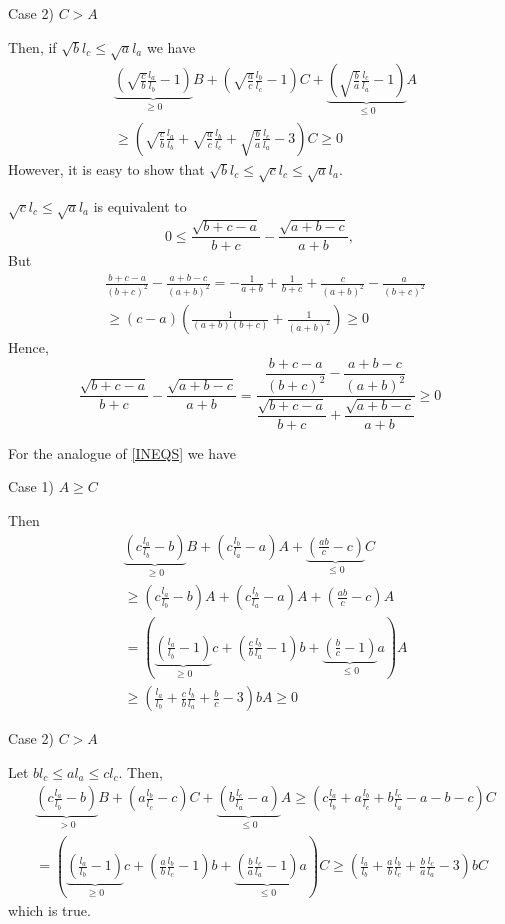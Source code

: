 \documentclass[a4paper,12pt]{article}
\begin{document}
Case 2) $C > A$

Then, if $\sqrt{b}l_c \leq \sqrt{a}{l_a}$ we have
\begin{align*}
&\underbrace{\left(\sqrt{\frac{c}{b}}\frac{l_a}{l_b}-1\right)}_{\geq 0} B+\left(\sqrt{\frac{a}{c}}\frac{l_b}{l_c}-1\right)C+\underbrace{\left(\sqrt{\frac{b}{a}}\frac{l_c}{l_a}-1\right)}_{\leq 0} A\\
&\geq \left(\sqrt{\frac{c}{b}}\frac{l_a}{l_b}+\sqrt{\frac{a}{c}}\frac{l_b}{l_c}+\sqrt{\frac{b}{a}}\frac{l_c}{l_a}-3\right)C \geq 0
\end{align*}
However, it is easy to show that $\sqrt{b}l_c \leq \sqrt{c}l_c  \leq \sqrt{a}{l_a}.$

$\sqrt{c}l_c  \leq \sqrt{a}{l_a}$ is equivalent to
\[
0 \leq \frac{\sqrt{b+c-a}}{b+c}   -    \frac{\sqrt{a+b-c}}{a+b} , 
\]
But
\begin{align*}
&\frac{b+c-a}{(b+c)^2} -\frac{a+b-c}{(a+b)^2}=-\frac{1}{a+b}+   \frac{1}{b+c}     + \frac{c}{(a+b)^2} - \frac{a}{(b+c)^2} \\
& \geq  (c-a)\left(\frac{1}{(a+b)(b+c)}+\frac{1}{(a+b)^2}\right) \geq 0
\end{align*}
Hence,
\[
\frac{\sqrt{b+c-a}}{b+c}   -    \frac{\sqrt{a+b-c}}{a+b}=\dfrac{\dfrac{b+c-a}{(b+c)^2} -\dfrac{a+b-c}{(a+b)^2}}{\dfrac{\sqrt{b+c-a}}{b+c}   + \dfrac{\sqrt{a+b-c}}{a+b} } \geq 0
\]


For the analogue of \eqref{INEQS} we have

Case 1) $A \geq C$

Then 
\begin{align*}
& \underbrace{\left(c\frac{l_a}{l_b}-b\right)}_{\geq 0}B+\left(c\frac{l_b}{l_a}-a\right)A+\underbrace{\left(\frac{ab}{c}-c\right)}_{\leq 0}C\\
&\geq \left(c\frac{l_a}{l_b}-b\right)A+\left(c\frac{l_b}{l_a}-a\right)A+\left(\frac{ab}{c}-c\right)A\\
&=\left(\underbrace{\left(\frac{l_a}{l_b}-1\right)}_{\geq 0}c+\left(\frac{c}{b}\frac{l_b}{l_a}-1\right)b+\underbrace{\left(\frac{b}{c}-1\right)}_{\leq 0}a\right)A \\
&\geq \left(\frac{l_a}{l_b}+\frac{c}{b}\frac{l_b}{l_a}+\frac{b}{c}-3\right)bA \geq 0
\end{align*}

Case 2) $C > A$


Let $bl_c \leq a l_a \leq cl_c.$ Then,
\begin{align*}
& \underbrace{\left(c\frac{l_a}{l_b}-b\right)}_{> 0} B+\left(a\frac{l_b}{l_c}-c\right)C+\underbrace{\left(b\frac{l_c}{l_a}-a\right)}_{\leq 0} A  \geq \left( c\frac{l_a}{l_b}+a\frac{l_b}{l_c}+b\frac{l_c}{l_a}-a-b-c\right)C\\
&= \left(  \underbrace{\left( \frac{l_a}{l_b} -1\right)}_{\geq 0}c  + \left(\frac{a}{b}\frac{l_b}{l_c}            -1 \right)b+\underbrace{\left(\frac{b}{a}\frac{l_c}{l_a}-1 \right)}_{\leq 0}a  \right)C \geq \left( \frac{l_a}{l_b} +\frac{a}{b}\frac{l_b}{l_c}  +      \frac{b}{a}\frac{l_c}{l_a}-3 \right)  bC
\end{align*}
which is true. 
\end{document}
